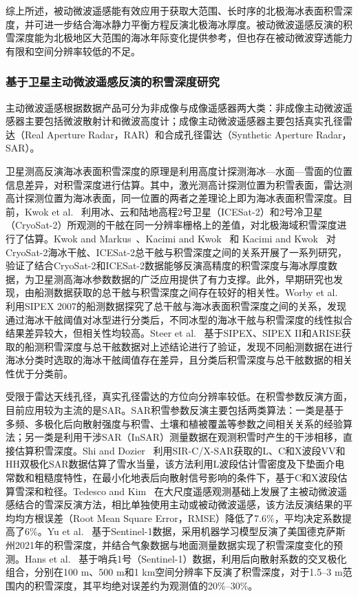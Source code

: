 综上所述，被动微波遥感能有效应用于获取大范围、长时序的北极海冰表面积雪深度，并可进一步结合海冰静力平衡方程反演北极海冰厚度。被动微波遥感反演的积雪深度能为北极地区大范围的海冰年际变化提供参考，但也存在被动微波穿透能力有限和空间分辨率较低的不足。

\subsubsection{基于卫星主动微波遥感反演的积雪深度研究}
主动微波遥感根据数据产品可分为非成像与成像遥感器两大类：非成像主动微波遥感器主要包括微波散射计和微波高度计；成像主动微波遥感器主要包括真实孔径雷达（Real Aperture Radar，RAR）和合成孔径雷达（Synthetic Aperture Radar，SAR）。

卫星测高反演海冰表面积雪深度的原理是利用高度计探测海冰—水面—雪面的位置信息差异，对积雪深度进行估算。其中，激光测高计探测位置为积雪表面，雷达测高计探测位置为海冰表面，同一位置的两者之差理论上即为海冰表面积雪深度。目前，Kwok et al.~\cite{kwok_kurtz2017} 利用冰、云和陆地高程2号卫星（ICESat-2）和2号冷卫星（CryoSat-2）所观测的干舷在同一分辨率栅格上的差值，对北极海域积雪深度进行了估算。Kwok and Markus~\cite{kwok_markus2018}、Kacimi and Kwok~\cite{kacimi_kwok2020} 和 Kacimi and Kwok~\cite{kacimi_kwok2022} 对CryoSat-2海冰干舷、ICESat-2总干舷与积雪深度之间的关系开展了一系列研究，验证了结合CryoSat-2和ICESat-2数据能够反演高精度的积雪深度与海冰厚度数据，为卫星测高海冰参数数据的广泛应用提供了有力支撑。此外，早期研究也发现，由船测数据获取的总干舷与积雪深度之间存在较好的相关性。Worby et al.~\cite{worby2011} 利用SIPEX 2007的船测数据探究了总干舷与海冰表面积雪深度之间的关系，发现通过海冰干舷阈值对冰型进行分类后，不同冰型的海冰干舷与积雪深度的线性拟合结果差异较大，但相关性均较高。Steer et al.~\cite{steer2016} 基于SIPEX、SIPEX II和ARISE获取的船测积雪深度与总干舷数据对上述结论进行了验证，发现不同船测数据在进行海冰分类时选取的海冰干舷阈值存在差异，且分类后积雪深度与总干舷数据的相关性优于分类前。

受限于雷达天线孔径，真实孔径雷达的方位向分辨率较低。在积雪参数反演方面，目前应用较为主流的是SAR。SAR积雪参数反演主要包括两类算法：一类是基于多频、多极化后向散射强度与积雪、土壤和植被覆盖等参数之间相关关系的经验算法；另一类是利用干涉SAR（InSAR）测量数据在观测积雪时产生的干涉相移，直接估算积雪深度。Shi and Dozier~\cite{shi_dozier2000a} 利用SIR-C/X-SAR获取的L、C和X波段VV和HH双极化SAR数据估算了雪水当量，该方法利用L波段估计雪密度及下垫面介电常数和粗糙度特性，在最小化地表后向散射信号影响的条件下，基于C和X波段估算雪深和粒径。Tedesco and Kim~\cite{tedesco_kim2006} 在大尺度遥感观测基础上发展了主被动微波遥感结合的雪深反演方法，相比单独使用主动或被动微波遥感，该方法反演结果的平均均方根误差（Root Mean Square Error，RMSE）降低了7.6\%，平均决定系数提高了6\%。Yu et al.~\cite{yu2022} 基于Sentinel-1数据，采用机器学习模型反演了美国德克萨斯州2021年的积雪深度，并结合气象数据与地面测量数据实现了积雪深度变化的预测。Hans et al.~\cite{hans2022} 基于哨兵1号（Sentinel-1）数据，利用后向散射系数的交叉极化组合，分别在100 m、500 m和1 km空间分辨率下反演了积雪深度，对于1.5–3 m范围内的积雪深度，其平均绝对误差约为观测值的20\%–30\%。


